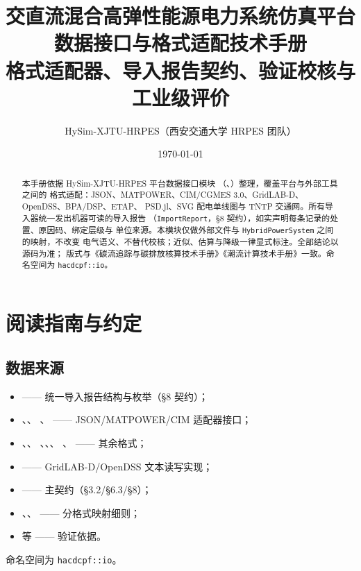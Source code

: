 \documentclass[UTF8,fontset=fandol,a4paper,11pt]{ctexart}
\title{\textbf{交直流混合高弹性能源电力系统仿真平台}\\[0.5em]
       {\Large 数据接口与格式适配技术手册}\\[0.3em]
       {\large 格式适配器、导入报告契约、验证校核与工业级评价}}
\author{HySim-XJTU-HRPES（西安交通大学 HRPES 团队）}
\date{\today}
\begin{document}
\maketitle
\begin{abstract}
\noindent 本手册依据 HySim-XJTU-HRPES 平台数据接口模块
（、）整理，覆盖平台与外部工具之间的
格式适配：JSON、MATPOWER、CIM/CGMES 3.0、GridLAB-D、OpenDSS、BPA/DSP、ETAP、
PSD.jl、SVG 配电单线图与 TNTP 交通网。所有导入器统一发出机器可读的导入报告
（\texttt{ImportReport}，§8 契约），如实声明每条记录的处置、原因码、绑定层级与
单位来源。本模块仅做外部文件与 \texttt{HybridPowerSystem} 之间的映射，不改变
电气语义、不替代校核；近似、估算与降级一律显式标注。全部结论以源码为准；
版式与《碳流追踪与碳排放核算技术手册》《潮流计算技术手册》一致。命名空间为
\texttt{hacdcpf::io}。
\end{abstract}

\tableofcontents
\newpage

\section{阅读指南与约定}
\subsection{数据来源}
\begin{itemize}
  \item {} —— 统一导入报告结构与枚举（§8 契约）；
  \item {}、、
        、 —— JSON/MATPOWER/CIM 适配器接口；
  \item {}、、
        、、、
        、 —— 其余格式；
  \item {} —— GridLAB-D/OpenDSS 文本读写实现；
  \item {} —— 主契约（§3.2/§6.3/§8）；
  \item {}、、
         —— 分格式映射细则；
  \item {} 等 —— 验证依据。
\end{itemize}
命名空间为 \texttt{hacdcpf::io}。
\end{document}
